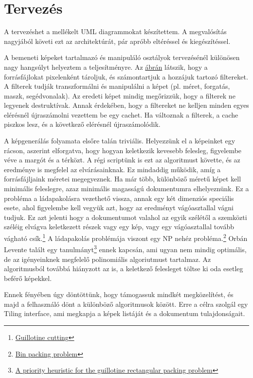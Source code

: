 \chapter{Tervezés}

A tervezéshet a mellékelt UML diagrammokat készítettem. A megvalósítás nagyjából követi ezt az architektúrát, pár apróbb eltéréssel és kiegészítéssel.

A bemeneti képeket tartalmazó és manipuláló osztályok tervezésénél különösen nagy hangsúlyt helyeztem a teljesítményre. Az \href{fig:ImageSource_uml}{ábrán} látszik, hogy a forrásfájlokat pixelenként tároljuk, és számontartjuk a hozzájuk tartozó filtereket. A filterek tudják transzformálni és manipulálni a képet (pl. méret, forgatás, maszk, segédvonalak). Az eredeti képet mindig megőrizzük, hogy a filterek ne legyenek destruktívak. Annak érdekében, hogy a filtereket ne kelljen minden egyes elérésnél újraszámolni vezettem be egy cachet. Ha változnak a filterek, a cache piszkos lesz, és a következő elérésnél újraszámolódik.

A képgenerálás folyamata elsőre talán triviális. Helyezzünk el a képeinket egy rácson, aszerint elforgatva, hogy hogyan keletkezik kevesebb felesleg, figyelembe véve a margót és a térközt. A régi scriptünk is ezt az algoritmust követte, és az eredménye is megfelel az elvárásainknak. Ez mindaddig működik, amíg a forrásfájljaink méretei megegyeznek. Ha már több, különböző méretű képet kell minimális feleslegre, azaz minimális magasságú dokumentumra elhelyeznünk. Ez a probléma a ládapakolásra vezethető vissza, annak egy két dimenziós speciális esete, ahol figyelembe kell vegyük azt, hogy az eredményt vágóasztallal vágni tudjuk. Ez azt jelenti hogy a dokumentumot valahol az egyik szélétől a szemközti széléig elvágva keletkezett részek vagy egy kép, vagy egy vágóasztallal tovább vágható csík.\footnote{\href{https://en.wikipedia.org/wiki/Guillotine_cutting}{Guillotine cutting}} A ládapakolás problémája viszont egy NP nehéz probléma.\footnote{\href{https://en.wikipedia.org/wiki/Bin_packing_problem}{Bin packing problem}} Orbán Levente talált egy tanulmányt\footnote{\href{https://sci-hub.se/10.1016/j.ipl.2015.08.008}{A priority heuristic for the guillotine rectangular packing
problem}} ennek kapcsán, ami ugyan nem mindig optimális, de az igényeinknek megfelelő polinomiális algoriutmust tartalmaz. Az algoritmusból továbbá hiányzott az is, a keletkező felesleget töltse ki oda esetleg beférő képekkel.

Ennek fényében úgy döntöttünk, hogy támogassuk mindkét megközelítést, és majd a felhasználó dönt a különböző algoritmusok között. Erre a célra szolgál egy Tiling interface, ami megkapja a képek listáját és a dokumentum tulajdonságait.

